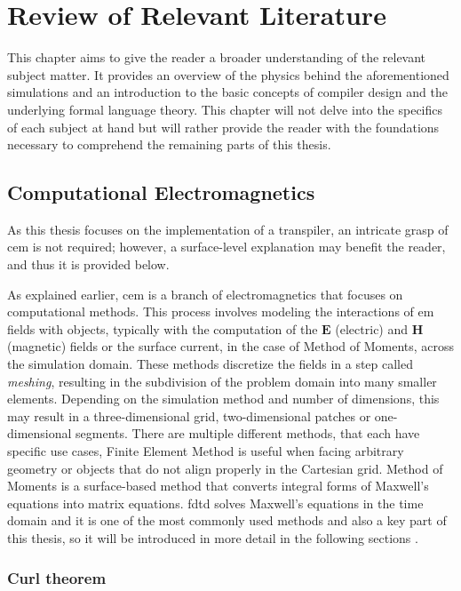\chapter{Review of Relevant Literature}
This chapter aims to give the reader a broader understanding of the relevant subject matter. It provides an overview of the physics behind the aforementioned simulations and an introduction to the basic concepts of compiler design and the underlying formal language theory. This chapter will not delve into the specifics of each subject at hand but will rather provide the reader with the foundations necessary to comprehend the remaining parts of this thesis.

\section{Computational Electromagnetics}
As this thesis focuses on the implementation of a transpiler, an intricate grasp of \gls{cem} is not required; however, a surface-level explanation may benefit the reader, and thus it is provided below.

As explained earlier, \gls{cem} is a branch of electromagnetics that focuses on computational methods. This process involves modeling the interactions of \gls{em} fields with objects, typically with the computation of the $\mathbf{E}$ (electric) and $\mathbf{H}$ (magnetic) fields or the surface current, in the case of Method of Moments, across the simulation domain. These methods discretize the fields in a step called \textit{meshing}, resulting in the subdivision of the problem domain into many smaller elements. Depending on the simulation method and number of dimensions, this may result in a three-dimensional grid, two-dimensional patches or one-dimensional segments. There are multiple different methods, that each have specific use cases, Finite Element Method is useful when facing arbitrary geometry or objects that do not align properly in the Cartesian grid. Method of Moments is a surface-based method that converts integral forms of Maxwell’s equations into matrix equations. \gls{fdtd} solves Maxwell’s equations in the time domain and it is one of the most commonly used methods and also a key part of this thesis, so it will be introduced in more detail in the following sections \cite{davidson_2010}.




\subsection*{Curl theorem}
